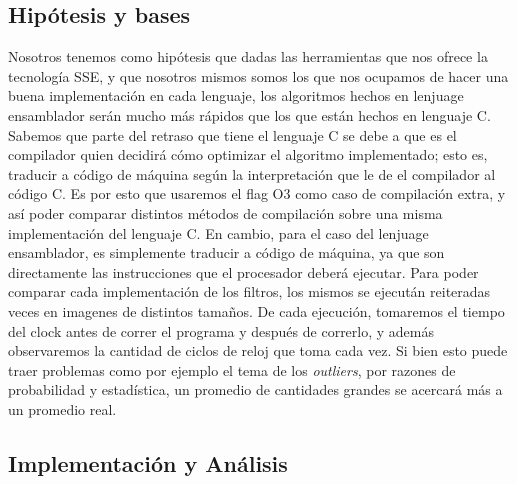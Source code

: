 \documentclass[a4paper]{article}
\begin{document}
\subsection{Hipótesis y bases}
Nosotros tenemos como hipótesis que dadas las herramientas que nos ofrece la tecnología SSE, y que nosotros mismos somos los que nos
ocupamos de hacer una buena implementación en cada lenguaje, los algoritmos hechos en lenjuage ensamblador serán mucho más rápidos
que los que están hechos en lenguaje C. Sabemos que parte del retraso que tiene el lenguaje C se debe a que es el compilador quien decidirá cómo
optimizar el algoritmo implementado; esto es, traducir a código de máquina según la interpretación que le de el compilador al código C. Es por esto
que usaremos el flag O3 como caso de compilación extra, y así poder comparar distintos métodos de compilación sobre una misma
implementación del lenguaje C.
En cambio, para el caso del lenjuage ensamblador, es simplemente traducir a código de máquina, ya que son directamente las instrucciones
que el procesador deberá ejecutar.
\newline
Para poder comparar cada implementación de los filtros, los mismos se ejecután reiteradas veces en imagenes de distintos tamaños.
De cada ejecución, tomaremos el tiempo del clock antes de correr el programa y después de correrlo, y además observaremos
la cantidad de ciclos de reloj que toma cada vez. Si bien esto puede traer problemas como por ejemplo el tema de los \textit{outliers},
por razones de probabilidad y estadística, un promedio de cantidades grandes se acercará más a un promedio real.

\subsection{Implementación y Análisis}
\end{document}
